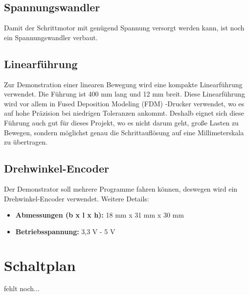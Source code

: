 \subsection{Spannungswandler}
Damit der Schrittmotor mit genügend Spannung versorgt werden kann, ist noch ein Spannungswandler verbaut. 
\subsection{Linearführung}
Zur Demonstration einer linearen Bewegung wird eine kompakte Linearführung verwendet. Die Führung ist 400 mm lang und 12 mm breit. Diese Linearführung wird vor allem in Fused Deposition Modeling (FDM) -Drucker verwendet, wo es auf hohe Präzision bei niedrigen Toleranzen ankommt. Deshalb eignet sich diese Führung auch gut für dieses Projekt, wo es nicht darum geht, große Lasten zu Bewegen, sondern möglichst genau die Schrittauflösung auf eine Millimeterskala zu übertragen.
\subsection{Drehwinkel-Encoder}
Der Demonstrator soll mehrere Programme fahren können, deswegen wird ein Drehwinkel-Encoder verwendet. %
Weitere Details: \begin{itemize}
	\item \textbf{Abmessungen (b x l x h):} 18 mm x 31 mm x 30 mm
	\item \textbf{Betriebsspannung:} 3,3 V - 5 V
	
\end{itemize}
\section{Schaltplan}
fehlt noch...




